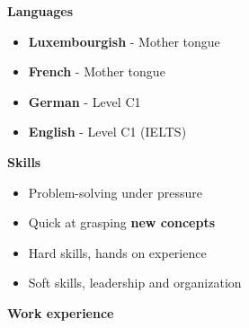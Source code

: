 \documentclass{article}
\begin{document}

\vspace{0.5cm} %
\begin{multicols}{2}

\centering %
\dotfill \textbf{\Large Languages}\dotfill
\vspace{0.5cm} %
\begin{minipage}[t]{\textwidth}
    \begin{itemize}
    	\item \textbf{Luxembourgish} - Mother tongue
    	\item \textbf{French} - Mother tongue
    	\item \textbf{German} - Level C1
    	\item \textbf{English} - Level C1 (IELTS)
    \end{itemize}
\end{minipage}%



\vspace{0.5cm} %
\centering %
\dotfill \textbf{\Large Skills } \dotfill
\vspace{0.5cm} %

\begin{minipage}[t]{\textwidth}
    \begin{itemize}
    	\item Problem-solving under pressure
    	\item Quick at grasping \textbf{new concepts}
        \item Hard skills, hands on experience
    	\item Soft skills, leadership and organization 
    \end{itemize}
\end{minipage}%

\end{multicols}


\vspace{0.5cm} %
\centering %
\dotfill \textbf{\Large Work experience} \dotfill
\vspace{0.5cm} %
\end{document}
